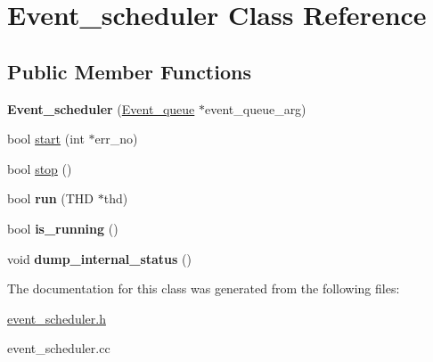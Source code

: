 \hypertarget{classEvent__scheduler}{}\section{Event\+\_\+scheduler Class Reference}
\label{classEvent__scheduler}
\subsection*{Public Member Functions}
\begin{DoxyCompactItemize}
\item 
{\bfseries Event\+\_\+scheduler} (\mbox{\hyperlink{classEvent__queue}{Event\+\_\+queue}} $\ast$event\+\_\+queue\+\_\+arg)
\item 
bool \mbox{\hyperlink{group__Event__Scheduler_gaf9de87da28f91daf6bbeb577dc029548}{start}} (int $\ast$err\+\_\+no)
\item 
bool \mbox{\hyperlink{group__Event__Scheduler_ga2efd565f1cc88f96232725ab8a1e36ae}{stop}} ()
\item 
bool {\bfseries run} (T\+HD $\ast$thd)
\item 
bool {\bfseries is\+\_\+running} ()
\item 
void {\bfseries dump\+\_\+internal\+\_\+status} ()
\end{DoxyCompactItemize}


The documentation for this class was generated from the following files\+:\begin{DoxyCompactItemize}
\item 
\mbox{\hyperlink{event__scheduler_8h}{event\+\_\+scheduler.\+h}}\item 
event\+\_\+scheduler.\+cc\end{DoxyCompactItemize}
